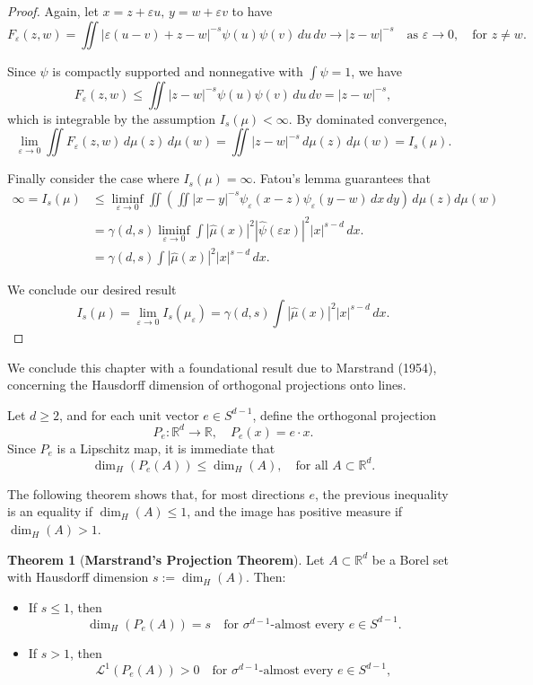 \documentclass[12pt,a4paper]{report}
\theoremstyle{definition}
\newtheorem{theorem}{Theorem}
\begin{document}
\begin{proof}
Again, let \( x = z + \varepsilon u, \, y = w + \varepsilon v \) to have
\[
F_\varepsilon(z, w) = \iint |\varepsilon(u - v) + z - w|^{-s} \psi(u) \psi(v) \, du \, dv
\to |z - w|^{-s}
\quad \text{as } \varepsilon \to 0, \quad \text{for } z \neq w.
\]

Since \( \psi \) is compactly supported and nonnegative with \( \int \psi = 1 \), we have
\[
F_\varepsilon(z, w) \le \iint |z - w|^{-s} \psi(u) \psi(v) \, du \, dv = |z - w|^{-s},
\]
which is integrable by the assumption \( I_s(\mu) < \infty \). By dominated convergence,
\[
\lim_{\varepsilon \to 0} \iint F_\varepsilon(z, w) \, d\mu(z) \, d\mu(w) = \iint |z - w|^{-s} \, d\mu(z) \, d\mu(w) = I_s(\mu).
\]


Finally consider the case where \( I_s(\mu) = \infty \). Fatou's lemma guarantees that
\begin{align*}
\infty = I_s(\mu)
&\le \liminf_{\varepsilon \to 0}
\iint \left( \iint |x - y|^{-s} \psi_\varepsilon(x - z) \psi_\varepsilon(y - w) \, dx \, dy \right)
\, d\mu(z) d\mu(w) \\
&= \gamma(d, s) \liminf_{\varepsilon \to 0}
\int |\widehat{\mu}(x)|^2 |\widehat{\psi}(\varepsilon x)|^2 |x|^{s - d} \, dx. \\
&= \gamma(d, s) \int |\widehat{\mu}(x)|^2 |x|^{s - d} \, dx.
\end{align*}

We conclude our desired result
\[
I_s(\mu) = \lim_{\varepsilon \to 0} I_s(\mu_\varepsilon) = \gamma(d,s) \int|\widehat{\mu}(x)|^2 |x|^{s-d} \, dx.
\]

\end{proof}


We conclude this chapter with a foundational result due to Marstrand (1954), concerning the Hausdorff dimension of orthogonal projections onto lines.

Let \( d \geq 2 \), and for each unit vector \( e \in S^{d-1} \), define the orthogonal projection
\[
P_e : \mathbb{R}^d \to \mathbb{R}, \quad P_e(x) = e \cdot x.
\]
Since \( P_e \) is a Lipschitz map, it is immediate that
\[
\dim_H(P_e(A)) \leq \dim_H(A), \quad \text{for all } A \subset \mathbb{R}^d.
\]

The following theorem shows that, for most directions \( e \), the previous inequality is an equality if \( \dim_H(A) \leq 1 \), and the image has positive measure if \( \dim_H(A) > 1 \).

\begin{theorem}[\textbf{Marstrand's Projection Theorem}]
Let \( A \subset \mathbb{R}^d \) be a Borel set with Hausdorff dimension \( s := \dim_H(A) \). Then:
\begin{itemize}
    \item[(a)] If \( s \leq 1 \), then
    \[
    \dim_H(P_e(A)) = s \quad \text{for } \sigma^{d-1}\text{-almost every } e \in S^{d-1}.
    \]

    \item[(b)] If \( s > 1 \), then
    \[
    \mathcal{L}^1(P_e(A)) > 0 \quad \text{for } \sigma^{d-1}\text{-almost every } e \in S^{d-1},
    \]
\end{itemize}
\end{theorem}
\end{document}
